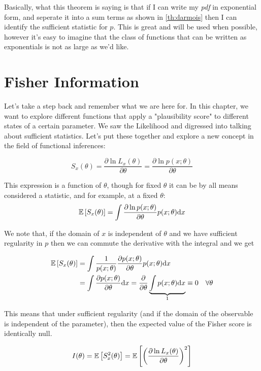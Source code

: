 Basically, what this theorem is saying is that if I can write my \emph{pdf} in exponential form, and seperate it into a sum terms as shown in \ref{th:darmois} then I can identify the sufficient statistic for $p$. This is great and will be used when possible, however it's easy to imagine that the class of functions that can be written as exponentials is not as large as we'd like.

\section{Fisher Information}

Let's take a step back and remember what we are here for. In this chapter, we want to explore different functions that apply a "plausibility score" to different states of a certain parameter. We saw the Likelihood and digressed into talking about sufficient statistics. Let's put these together and explore a new concept in the field of functional inferences:

\begin{definition}
	\[
	S_x(\theta) = \frac{\partial \ln L_x(\theta)}{\partial \theta} = \frac{\partial \ln p(x;\theta)}{\partial \theta}
	\]
\label{def:Fisher_S}
\end{definition}

This expression is a function of $\theta$, though for fixed $\theta$ it can be by all means considered a statistic, and for example, at a fixed $\theta$:
	\[
	\mathbb{E}\left[ S_x(\theta) \right] = \int \frac{\partial \ln p(x;\theta)}{\partial \theta}p(x;\theta)\mathrm{d} x
	\]

We note that, if the domain of $x$ is independent of $\theta$ and we have sufficient regularity in $p$ then we can commute the derivative with the integral and we get

	\begin{align*}
	\mathbb{E}\left[ S_x(\theta) \right] &= \int\frac{1}{p(x;\theta)}\frac{\partial p(x;\theta)}{\partial \theta} p(x;\theta) \mathrm{d} x \\
	&= \int \frac{\partial p(x;\theta)}{\partial\theta} \mathrm{d} x = \frac{\partial}{\partial \theta}\underbrace{\int p(x;\theta)\mathrm{d} x}_1 \equiv 0\quad \forall \theta
	\end{align*}

This means that under sufficient regularity (and if the domain of the observable is independent of the parameter), then the expected value of the Fisher score is identically null.

\begin{definition}
	\[
	I(\theta) = \mathbb{E}\left[ S^2_x(\theta) \right] = \mathbb{E}\left[\left( \frac{\partial \ln L_x(\theta)}{\partial\theta}\right)^2\right]
	\]
\end{definition}

